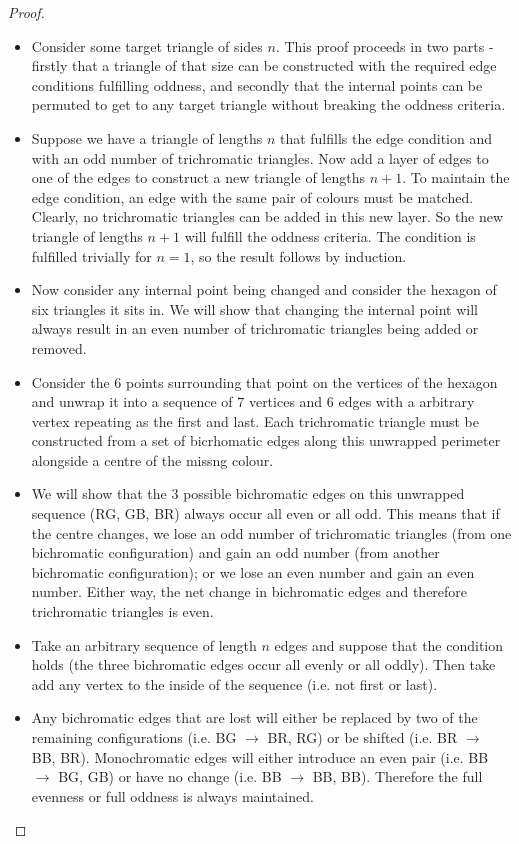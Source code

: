 \documentclass[12pt]{article}
\begin{document}
\begin{proof}
    \begin{itemize}
        \item Consider some target triangle of sides $n$. This proof proceeds in two parts - firstly that a triangle of that size can be constructed with the required edge conditions fulfilling oddness, and secondly that the internal points can be permuted to get to any target triangle without breaking the oddness criteria.
        \item Suppose we have a triangle of lengths $n$ that fulfills the edge condition and with an odd number of trichromatic triangles. Now add a layer of edges to one of the edges to construct a new triangle of lengths $n+1$. To maintain the edge condition, an edge with the same pair of colours must be matched. Clearly, no trichromatic triangles can be added in this new layer. So the new triangle of lengths $n+1$ will fulfill the oddness criteria. The condition is fulfilled trivially for $n=1$, so the result follows by induction.
        \item Now consider any internal point being changed and consider the hexagon of six triangles it sits in. We will show that changing the internal point will always result in an even number of trichromatic triangles being added or removed.
        \item Consider the $6$ points surrounding that point on the vertices of the hexagon and unwrap it into a sequence of $7$ vertices and $6$ edges with a arbitrary vertex repeating as the first and last. Each trichromatic triangle must be constructed from a set of bicrhomatic edges along this unwrapped perimeter alongside a centre of the missng colour.
        \item We will show that the 3 possible bichromatic edges on this unwrapped sequence (RG, GB, BR) always occur all even or all odd. This means that if the centre changes, we lose an odd number of trichromatic triangles (from one bichromatic configuration) and gain an odd number (from another bichromatic configuration); or we lose an even number and gain an even number. Either way, the net change in bichromatic edges and therefore trichromatic triangles is even.
        \item Take an arbitrary sequence of length $n$ edges and suppose that the condition holds (the three bichromatic edges occur all evenly or all oddly). Then take add any vertex to the inside of the sequence (i.e. not first or last).
        \item Any bichromatic edges that are lost will either be replaced by two of the remaining configurations (i.e. BG $\to$ BR, RG) or be shifted (i.e. BR $\to$ BB, BR). Monochromatic edges will either introduce an even pair (i.e. BB $\to$ BG, GB) or have no change (i.e. BB $\to$ BB, BB). Therefore the full evenness or full oddness is always maintained.

\end{itemize}
\end{proof}
\end{document}
